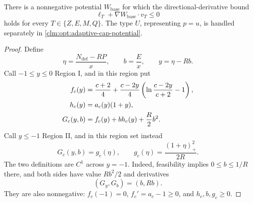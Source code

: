 \begin{claim}
\label{clm:opt:adaptive-base-potential}
There is a nonnegative potential $W_{\mathrm{base}}$ for which the
directional-derivative bound
\[
 \ell_T+\nabla W_{\mathrm{base}}\mathbin{\cdot}v_T\le0
\]
holds for every $T\in\{Z,E,M,Q\}$.
The type $U$, representing $p=u$, is handled separately in
\cref{clm:opt:adaptive-cap-potential}.
\end{claim}

\begin{proof}
Define
\begin{equation}
 \eta=\frac{N_{\mathrm{def}}-RP}{x},
 \qquad b=\frac Ex,
 \qquad y=\eta-Rb.
 \label{eq:opt:eta-b}
\end{equation}
Call $-1\le y\le0$ Region I, and in this region put
\begin{align}
 f_c(y)
 &=\frac{c+2}{4}
   +\frac{c-2y}{4}
      \left(\ln\frac{c-2y}{c+2}-1\right),
 \label{eq:opt:f-definition}\\
 h_c(y)&=a_c(y)(1+y),
 \notag\\
 G_c(y,b)&=f_c(y)+b h_c(y)+\frac R2b^2.
 \label{eq:opt:G-region-one}
\end{align}
Call $y\le-1$ Region II, and in this region set instead
\begin{equation}
 G_c(y,b)=g_c(\eta),
 \qquad
 g_c(\eta)=\frac{(1+\eta)_+^2}{2R}.
 \label{eq:opt:G-region-two}
\end{equation}
The two definitions are $C^1$ across $y=-1$.  Indeed, feasibility
implies $0\le b\le1/R$ there, and both sides have value $Rb^2/2$ and
derivatives
\[
 (G_y,G_b)=(b,Rb).
\]
They are also nonnegative: $f_c(-1)=0$,
$f_c'=a_c-1\ge0$, and $h_c,b,g_c\ge0$.


\end{proof}
